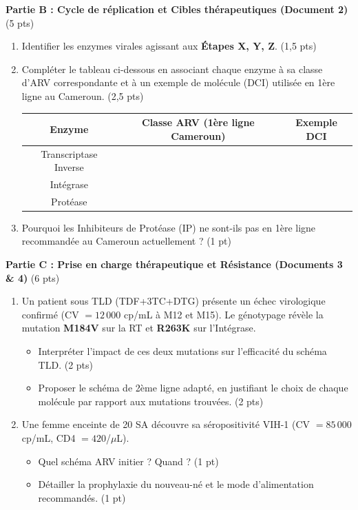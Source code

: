 \documentclass[11pt]{article}
\begin{document}
\begin{exercice}
\textbf{Partie B : Cycle de réplication et Cibles thérapeutiques (Document 2)} \hfill (5 pts)
\begin{enumerate}
\item Identifier les enzymes virales agissant aux \textbf{Étapes X, Y, Z}. \hfill (1,5 pts)
\item Compléter le tableau ci-dessous en associant chaque enzyme à sa classe d'ARV correspondante et à un exemple de molécule (DCI) utilisée en 1ère ligne au Cameroun. \hfill (2,5 pts)
\begin{center}
\begin{tabular}{|c|c|c|}\hline
\textbf{Enzyme} & \textbf{Classe ARV (1ère ligne Cameroun)} & \textbf{Exemple DCI} \\ \hline
Transcriptase Inverse & & \\ \hline
Intégrase & & \\ \hline
Protéase & & \\ \hline
\end{tabular}
\end{center}
\item Pourquoi les Inhibiteurs de Protéase (IP) ne sont-ils pas en 1ère ligne recommandée au Cameroun actuellement ? \hfill (1 pt)
\end{enumerate}

\textbf{Partie C : Prise en charge thérapeutique et Résistance (Documents 3 \& 4)} \hfill (6 pts)
\begin{enumerate}
\item Un patient sous TLD (TDF+3TC+DTG) présente un échec virologique confirmé (CV $= 12\,000$ cp/mL à M12 et M15). Le génotypage révèle la mutation \textbf{M184V} sur la RT et \textbf{R263K} sur l'Intégrase.
\begin{itemize}
\item[a)] Interpréter l'impact de ces deux mutations sur l'efficacité du schéma TLD. \hfill (2 pts)
\item[b)] Proposer le schéma de 2ème ligne adapté, en justifiant le choix de chaque molécule par rapport aux mutations trouvées. \hfill (2 pts)
\end{itemize}
\item Une femme enceinte de 20 SA découvre sa séropositivité VIH-1 (CV $= 85\,000$ cp/mL, CD4 $= 420$/$\mu$L).
\begin{itemize}
\item[a)] Quel schéma ARV initier ? Quand ? \hfill (1 pt)
\item[b)] Détailler la prophylaxie du nouveau-né et le mode d'alimentation recommandés. \hfill (1 pt)
\end{itemize}
\end{enumerate}


\end{exercice}
\end{document}

